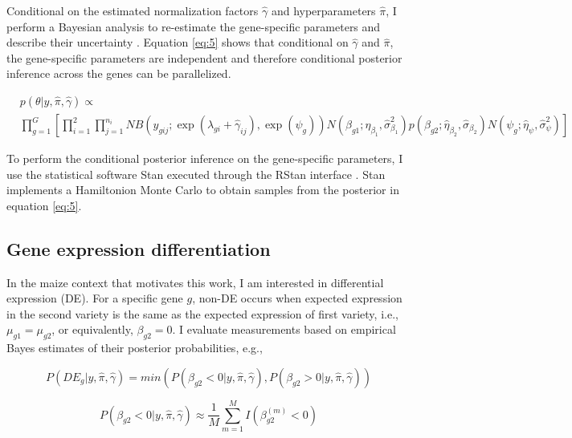 Conditional on the estimated normalization factors $\hat{\gamma}$ and hyperparameters $\hat{\pi}$, I perform a Bayesian analysis to re-estimate the gene-specific parameters and describe their uncertainty \citep{niemi2015empirical}. Equation \ref{eq:5} shows that conditional on $\hat{\gamma}$ and $\hat{\pi}$, the gene-specific parameters are independent and therefore conditional posterior inference across the genes can be parallelized. 

\begin{equation}
\label{eq:5}
\begin{split}
& p(\theta | y, \hat{\pi}, \hat{\gamma})  \propto \\ & \prod_{g=1}^{G} \left[ \prod_{i=1}^{2} \prod_{j=1}^{n_i} NB(y_{gij} ; \exp(\lambda_{gi} + \hat{\gamma}_{ij}), \exp(\psi_g)) N(\beta_{g1} ; \hat{\eta}_{\beta_1}, \hat{\sigma}^2_{\beta_1}) p(\beta_{g2} ; \hat{\eta}_{\beta_2}, \hat{\sigma}_{\beta_2}) N(\psi_g ; \hat{\eta}_{\psi}, \hat{\sigma}^2_{\psi})  \right]
\end{split}
\end{equation}

To perform the conditional posterior inference on the gene-specific parameters, I use the statistical software Stan \citep{stan2014stan} executed through the RStan interface \citep{team2016rstan}. Stan implements a Hamiltonion Monte Carlo \citep{neal2011mcmc} to obtain samples from the posterior in equation \ref{eq:5}. 


\subsection{Gene expression differentiation}

In the maize context that motivates this work, I am interested in differential expression (DE). For a specific gene $g$, non-DE occurs when expected expression in the second variety is the same as the expected expression of first variety, i.e., $\mu_{g1} = \mu_{g2}$, or equivalently, $\beta_{g2}=0$.  I evaluate measurements based on empirical Bayes estimates of their posterior probabilities, e.g., 

\begin{equation}
\label{eq:6}
P(DE_g | y, \hat{\pi}, \hat{\gamma}) =min( P(\beta_{g2}< 0 | y, \hat{\pi}, \hat{\gamma}),  P(\beta_{g2}> 0 | y, \hat{\pi}, \hat{\gamma}))
\end{equation}

$$P(\beta_{g2}< 0 | y, \hat{\pi}, \hat{\gamma}) \approx \frac{1}{M} \sum_{m=1}^M I(\beta_{g2} ^ {(m)} < 0)$$

